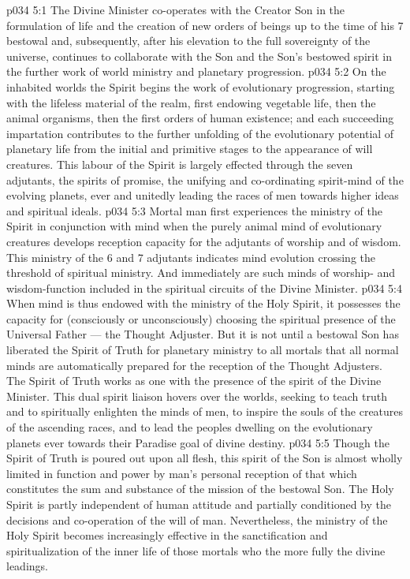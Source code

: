 \vs p034 5:1 The Divine Minister co\hyp{}operates with the Creator Son in the formulation of life and the creation of new orders of beings up to the time of his 7 bestowal and, subsequently, after his elevation to the full sovereignty of the universe, continues to collaborate with the Son and the Son’s bestowed spirit in the further work of world ministry and planetary progression.
\vs p034 5:2 On the inhabited worlds the Spirit begins the work of evolutionary progression, starting with the lifeless material of the realm, first endowing vegetable life, then the animal organisms, then the first orders of human existence; and each succeeding impartation contributes to the further unfolding of the evolutionary potential of planetary life from the initial and primitive stages to the appearance of will creatures. This labour of the Spirit is largely effected through the seven adjutants, the spirits of promise, the unifying and co\hyp{}ordinating spirit\hyp{}mind of the evolving planets, ever and unitedly leading the races of men towards higher ideas and spiritual ideals.
\vs p034 5:3 \pc Mortal man first experiences the ministry of the Spirit in conjunction with mind when the purely animal mind of evolutionary creatures develops reception capacity for the adjutants of worship and of wisdom. This ministry of the 6 and 7 adjutants indicates mind evolution crossing the threshold of spiritual ministry. And immediately are such minds of worship\hyp{} and wisdom\hyp{}function included in the spiritual circuits of the Divine Minister.
\vs p034 5:4 When mind is thus endowed with the ministry of the Holy Spirit, it possesses the capacity for (consciously or unconsciously) choosing the spiritual presence of the Universal Father --- the Thought Adjuster. But it is not until a bestowal Son has liberated the Spirit of Truth for planetary ministry to all mortals that all normal minds are automatically prepared for the reception of the Thought Adjusters. The Spirit of Truth works as one with the presence of the spirit of the Divine Minister. This dual spirit liaison hovers over the worlds, seeking to teach truth and to spiritually enlighten the minds of men, to inspire the souls of the creatures of the ascending races, and to lead the peoples dwelling on the evolutionary planets ever towards their Paradise goal of divine destiny.
\vs p034 5:5 Though the Spirit of Truth is poured out upon all flesh, this spirit of the Son is almost wholly limited in function and power by man’s personal reception of that which constitutes the sum and substance of the mission of the bestowal Son. The Holy Spirit is partly independent of human attitude and partially conditioned by the decisions and co\hyp{}operation of the will of man. Nevertheless, the ministry of the Holy Spirit becomes increasingly effective in the sanctification and spiritualization of the inner life of those mortals who the more fully  the divine leadings.
